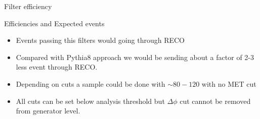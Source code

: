 \documentclass[8pt]{beamer}
\begin{document}
\begin{frame}{Filter efficiency}
\begin{block}{Efficiencies and Expected events}
\end{block}

\begin{itemize}
  \item Events passing this filters would going through RECO
  \item Compared with Pythia8 approach we would be sending about a factor of 2-3 less event through RECO.
  \item Depending on cuts a sample could be done with $\sim 80-120$ with no MET cut
  \item All cuts can be set below analysis threshold but $\Delta\phi$ cut cannot be removed from generator level. 
\end{itemize}

\end{frame}

\end{document}
